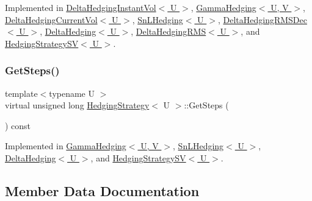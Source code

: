 Implemented in \hyperlink{classDeltaHedgingInstantVol_ac05386c300db720ed07d8465123a8f7a}{Delta\+Hedging\+Instant\+Vol$<$ U $>$}, \hyperlink{classGammaHedging_afbdeab9edb6f515f8df2c1aac8ad54c0}{Gamma\+Hedging$<$ U, V $>$}, \hyperlink{classDeltaHedgingCurrentVol_ad235325f348bd58eb54d9dec389aa2e9}{Delta\+Hedging\+Current\+Vol$<$ U $>$}, \hyperlink{classSnLHedging_a6d3f4f5b4e0a56935b9155222a95a76e}{Sn\+L\+Hedging$<$ U $>$}, \hyperlink{classDeltaHedgingRMSDec_aa9118ce56921178e38a7ed8a6acee656}{Delta\+Hedging\+R\+M\+S\+Dec$<$ U $>$}, \hyperlink{classDeltaHedging_a670264651c7c2a3ce404bca291d2194f}{Delta\+Hedging$<$ U $>$}, \hyperlink{classDeltaHedgingRMS_ad1dfe5625f1064b9b1f8a45b20f0ee50}{Delta\+Hedging\+R\+M\+S$<$ U $>$}, and \hyperlink{classHedgingStrategySV_abb9531c069f4d1e758fc23c4bc7ed09c}{Hedging\+Strategy\+S\+V$<$ U $>$}.

\hypertarget{classHedgingStrategy_a4df1155158f019fb0c4f565045b9e633}{}\label{classHedgingStrategy_a4df1155158f019fb0c4f565045b9e633} 
\subsubsection{\texorpdfstring{Get\+Steps()}{GetSteps()}}
{\footnotesize\ttfamily template$<$typename U $>$ \\
virtual unsigned long \hyperlink{classHedgingStrategy}{Hedging\+Strategy}$<$ U $>$\+::Get\+Steps (\begin{DoxyParamCaption}{ }\end{DoxyParamCaption}) const\hspace{0.3cm}{\ttfamily [pure virtual]}}



Implemented in \hyperlink{classGammaHedging_a69b52f6cdb02d3289bf00029331625fe}{Gamma\+Hedging$<$ U, V $>$}, \hyperlink{classSnLHedging_ac44156b45dd20237fc5030877f9b6c66}{Sn\+L\+Hedging$<$ U $>$}, \hyperlink{classDeltaHedging_a0a6d6d2f73dfcf3425927cc45a012a2a}{Delta\+Hedging$<$ U $>$}, and \hyperlink{classHedgingStrategySV_a8cdbb26bfa8da99f16161f2449928a5e}{Hedging\+Strategy\+S\+V$<$ U $>$}.



\subsection{Member Data Documentation}
\hypertarget{classHedgingStrategy_ac96528e9f4e5a0d1e5aadcc2ebdcab55}{}\label{classHedgingStrategy_ac96528e9f4e5a0d1e5aadcc2ebdcab55} 

